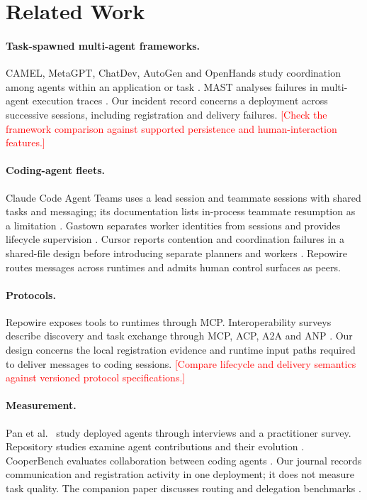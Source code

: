 \documentclass[10pt,twocolumn]{article}
\newcommand{\todo}[1]{\textcolor{red}{[#1]}}
\newcommand{\sys}{Repowire}
\begin{document}
\section{Related Work}
\label{sec:related}

\paragraph{Task-spawned multi-agent frameworks.}
CAMEL, MetaGPT, ChatDev, AutoGen and OpenHands study coordination among agents within an application or task \citep{li2023camel,hong2024metagpt,qian2024chatdev,wu2023autogen,openhands2024}. MAST analyses failures in multi-agent execution traces \citep{cemri2025mast}. Our incident record concerns a deployment across successive sessions, including registration and delivery failures. \todo{Check the framework comparison against supported persistence and human-interaction features.}

\paragraph{Coding-agent fleets.}
Claude Code Agent Teams uses a lead session and teammate sessions with shared tasks and messaging; its documentation lists in-process teammate resumption as a limitation \citep{agentteams2026}. Gastown separates worker identities from sessions and provides lifecycle supervision \citep{gastown2026}. Cursor reports contention and coordination failures in a shared-file design before introducing separate planners and workers \citep{cursor2026}. \sys{} routes messages across runtimes and admits human control surfaces as peers.

\paragraph{Protocols.}
\sys{} exposes tools to runtimes through MCP. Interoperability surveys describe discovery and task exchange through MCP, ACP, A2A and ANP \citep{ehtesham2025survey,mcp2025survey}. Our design concerns the local registration evidence and runtime input paths required to deliver messages to coding sessions. \todo{Compare lifecycle and delivery semantics against versioned protocol specifications.}

\paragraph{Measurement.}
Pan et al.\ \citep{pan2026measuring} study deployed agents through interviews and a practitioner survey. Repository studies examine agent contributions and their evolution \citep{agarwal2026velocity,mazloomzadeh2026prs,msr2026survival}. CooperBench evaluates collaboration between coding agents \citep{khatua2026cooperbench}. Our journal records communication and registration activity in one deployment; it does not measure task quality. The companion paper discusses routing and delegation benchmarks \citep{decisionbench2026,orchbench2026,routerbench2024}.
\end{document}
